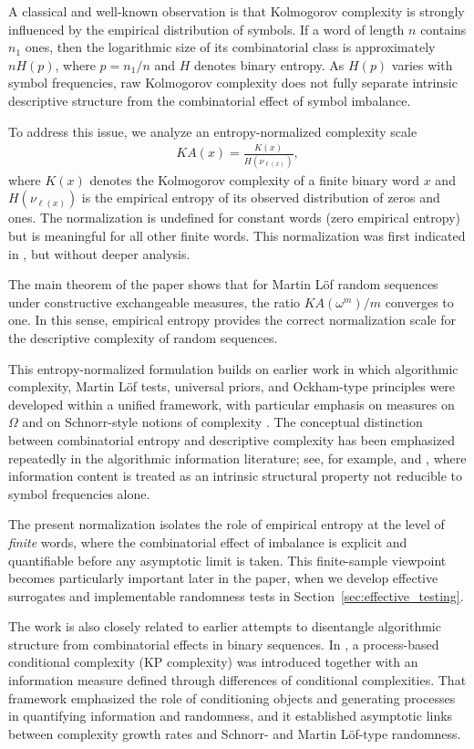 \documentclass[12pt]{article}
\newcommand{\be}{\begin{eqnarray}}
\newcommand{\ee}{\end{eqnarray}}
\begin{document}
A classical and well-known observation is that Kolmogorov complexity is
strongly influenced by the empirical distribution of symbols. If a word of
length $n$ contains $n_1$ ones, then the logarithmic size of its combinatorial
class is approximately $nH(p)$, where $p=n_1/n$ and $H$ denotes binary entropy.
As $H(p)$ varies with symbol frequencies, raw Kolmogorov complexity does not
fully separate intrinsic descriptive structure from the combinatorial effect of
symbol imbalance.

To address this issue, we analyze an entropy-normalized complexity scale
\be
KA(x) = \frac{K(x)}{H(\nu_{\ell(x)})},
\label{eq:KA_def_intro}
\ee
where $K(x)$ denotes the Kolmogorov complexity of a finite binary word $x$ and
$H(\nu_{\ell(x)})$ is the empirical entropy of its observed distribution of zeros
and ones. The normalization is undefined for constant words (zero empirical
entropy) but is meaningful for all other finite words. 
This normalization was first indicated in \citet{ZvonkinLevin1970}, but without deeper analysis.

The main theorem of the
paper shows that for Martin L\"of random sequences under constructive
exchangeable measures, the ratio $KA(\omega^m)/m$ converges to one. In this
sense, empirical entropy provides the correct normalization scale for the
descriptive complexity of random sequences.

This entropy-normalized formulation builds on earlier work in which algorithmic
complexity, Martin L\"of tests, universal priors, and Ockham-type principles
were developed within a unified framework, with particular emphasis on
measures on $\Omega$ and on Schnorr-style notions of complexity
\citep{ZvonkinLevin1970,Schnorr1971,Vidakovic1988}. The conceptual distinction
between combinatorial entropy and descriptive complexity has been emphasized
repeatedly in the algorithmic information literature; see, for example,
\citet{Kramosil1982} and \citet{Calude2002}, where information content is treated
as an intrinsic structural property not reducible to symbol frequencies alone.

The present normalization isolates the role of empirical entropy at the level of
\emph{finite} words, where the combinatorial effect of imbalance is explicit and
quantifiable before any asymptotic limit is taken. This finite-sample viewpoint
becomes particularly important later in the paper, when we develop effective
surrogates and implementable randomness tests in
Section~\ref{sec:effective_testing}.

The work is also closely related to earlier attempts to disentangle algorithmic
structure from combinatorial effects in binary sequences. In
\citet{Vidakovic1983Process}, a process-based conditional complexity (KP
complexity) was introduced together with an information measure defined through
differences of conditional complexities. That framework emphasized the role of
conditioning objects and generating processes in quantifying information and
randomness, and it established asymptotic links between complexity growth rates
and Schnorr- and Martin L\"of-type randomness.
\end{document}
